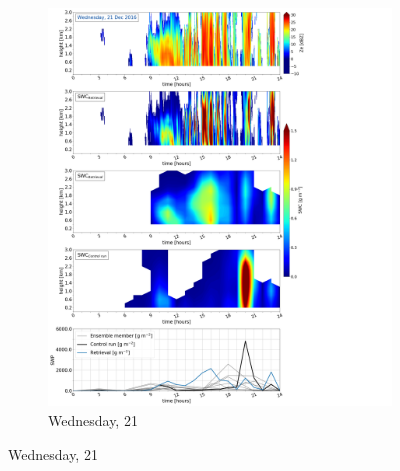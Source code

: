 \begin{figure}[h]
	\centering
		\begin{subfigure}[b]{0.8\textwidth}
			\includegraphics[trim={0.5cm 0.5cm 17.5cm .5cm},clip,width=\textwidth]{./fig_SWC/20161221}
			\caption{Wednesday, \SI{21}{\dec}}\label{fig:SWC21}
		\end{subfigure}
\end{figure}
